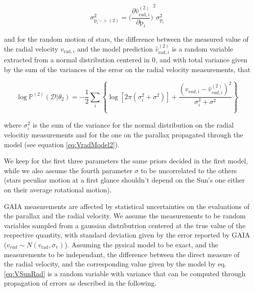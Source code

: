 \begin{equation}\label{eq:ParallaxErrorPropagation}
    \sigma^2_{\text{p}_i -> (2)} = {\biggl( \frac{\partial \hat{v}^{(2)}_{\text{rad}, i}}{\partial \text{p}_i} \biggr)}^2 \sigma^2_{\text{p}_i}
\end{equation}

and for the random motion of stars, the difference between the measured value of the radial velocity $v_{\text{rad}, i}$
 and the model prediction $\hat{v}^{(2)}_{\text{rad}, i}$ is a random variable extracted from a normal distribution centered in 0, 
 and with total variance given by the sum of the variances of the error on the radial velocity measurements, that 

\begin{equation}\label{Eq:LogLikeMod2}
    \log \mathbb{P}^{(2)}(\mathcal{D} \vert \theta_2) = -\frac{1}{2}\sum_i\left\{\log[2\pi(\sigma_{i}^2+\sigma^2)]+\frac{(v_{rad,i} - \hat{v}_{rad,i}^{(2)})^2}{\sigma_{i}^2+\sigma^2}\right\}
\end{equation}

\noindent where $\sigma_i^2$ is the sum of the variance for the normal distribution on the radial velocitiy measurements 
and for the one on the parallax propagated through the model (see equation \ref{eq:VradModel2}).

We keep for the first three parameters the same priors decided in the first model, 
while we also assume the fourth parameter $\sigma$ to be uncorrelated to the others 
(stars peculiar motion at a first glance shouldn't depend on the Sun's one either on their average rotational motion). 

GAIA measurements are affected by statistical uncertainties on the evaluations of the parallax and the radial velocity. 
We assume the measurements to be random variables sampled from a gaussian distributrion 
centered at the true value of the respective quantity, with standard deviation 
given by the error reported by GAIA ($v_{rad} \sim N(v_{\text{rad}},\sigma_{\text{v}})$). 
Assuming the pysical model to be exact, and the measurements to be independant, 
the difference between the direct measure of the radial velocity, 
and the corresponding value given by the model by eq.\ref{eq:VSunRad} is a random variable 
with variance that can be computed through propagation of errors as described in the following. 